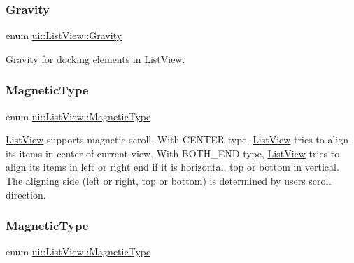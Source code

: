 \subsubsection{\texorpdfstring{Gravity}{Gravity}\hspace{0.1cm}{\footnotesize\ttfamily [2/2]}}
{\footnotesize\ttfamily enum \hyperlink{classui_1_1ListView_af79b44631b38c1782c384830acf20cf6}{ui\+::\+List\+View\+::\+Gravity}\hspace{0.3cm}{\ttfamily [strong]}}

Gravity for docking elements in \hyperlink{classui_1_1ListView}{List\+View}. \mbox{\label{classui_1_1ListView_a143593e762b785241572552b060aed6f}} 
\subsubsection{\texorpdfstring{Magnetic\+Type}{MagneticType}\hspace{0.1cm}{\footnotesize\ttfamily [1/2]}}
{\footnotesize\ttfamily enum \hyperlink{classui_1_1ListView_a143593e762b785241572552b060aed6f}{ui\+::\+List\+View\+::\+Magnetic\+Type}\hspace{0.3cm}{\ttfamily [strong]}}

\hyperlink{classui_1_1ListView}{List\+View} supports magnetic scroll. With C\+E\+N\+T\+ER type, \hyperlink{classui_1_1ListView}{List\+View} tries to align its items in center of current view. With B\+O\+T\+H\+\_\+\+E\+ND type, \hyperlink{classui_1_1ListView}{List\+View} tries to align its items in left or right end if it is horizontal, top or bottom in vertical. The aligning side (left or right, top or bottom) is determined by user\textquotesingle{}s scroll direction. \mbox{\label{classui_1_1ListView_a143593e762b785241572552b060aed6f}} 
\subsubsection{\texorpdfstring{Magnetic\+Type}{MagneticType}\hspace{0.1cm}{\footnotesize\ttfamily [2/2]}}
{\footnotesize\ttfamily enum \hyperlink{classui_1_1ListView_a143593e762b785241572552b060aed6f}{ui\+::\+List\+View\+::\+Magnetic\+Type}\hspace{0.3cm}{\ttfamily [strong]}}

